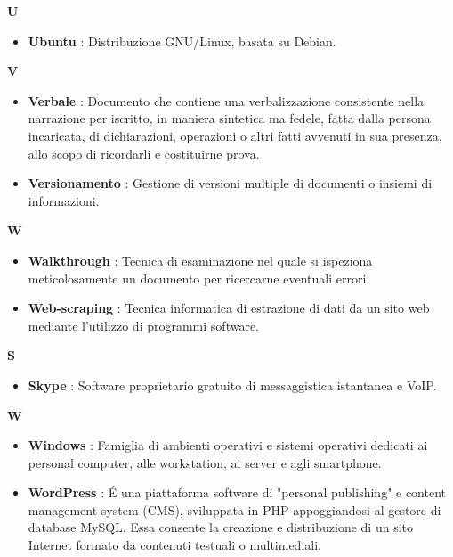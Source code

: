 \newpage
{\huge \textbf{U}}
\begin{flushleft}
\begin{itemize}[label={}]
\item \textbf{Ubuntu} : Distribuzione GNU/Linux, basata su Debian.
\end{itemize}
\end{flushleft}
\newpage
{\huge \textbf{V}}
\begin{flushleft}
\begin{itemize}[label={}]
\item \textbf{Verbale} : Documento che contiene una verbalizzazione consistente nella narrazione per iscritto, in maniera sintetica ma fedele, fatta dalla persona incaricata, di dichiarazioni, operazioni o altri fatti avvenuti in sua presenza, allo scopo di ricordarli e costituirne prova.
\item \textbf{Versionamento} : Gestione di versioni multiple di documenti o insiemi di informazioni.
\end{itemize}
\end{flushleft}
\newpage
{\huge \textbf{W}}
\begin{flushleft}
\begin{itemize}[label={}]
\item \textbf{Walkthrough} : Tecnica di esaminazione nel quale si ispeziona meticolosamente un documento per ricercarne eventuali errori.
\item \textbf{Web-scraping} : Tecnica informatica di estrazione di dati da un sito web mediante l'utilizzo di programmi software.
\end{itemize}
\end{flushleft}
\newpage
{\huge \textbf{S}}
\begin{flushleft}
\begin{itemize}[label={}]
\item \textbf{Skype} : Software proprietario gratuito di messaggistica istantanea e VoIP.
\end{itemize}
\end{flushleft}
\newpage
{\huge \textbf{W}}
\begin{flushleft}
\begin{itemize}[label={}]
\item \textbf{Windows} : Famiglia di ambienti operativi e sistemi operativi dedicati ai personal computer, alle workstation, ai server e agli smartphone.
\item \textbf{WordPress} : \'{E} una piattaforma software di "personal publishing" e content management system (CMS), sviluppata in PHP appoggiandosi al gestore di database MySQL. Essa consente la creazione e distribuzione di un sito Internet formato da contenuti testuali o multimediali.
\end{itemize}
\end{flushleft}
\newpage
